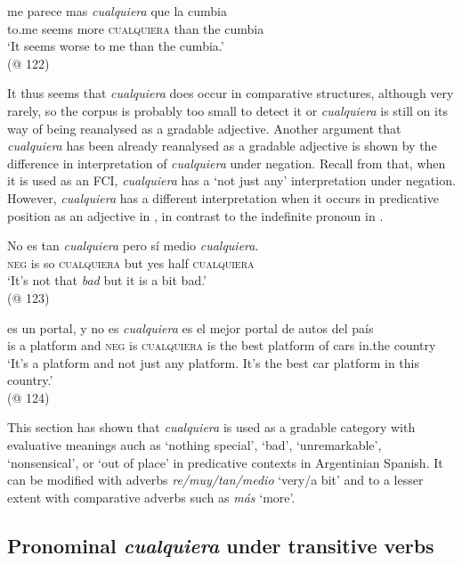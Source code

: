 \ea \label{ex:key:209} %
    \gll me parece mas \textit{cualquiera} que la cumbia\\
    to.me seems more \textsc{cualquiera} than the cumbia\\
    \glt ‘It seems worse to me than the cumbia.’\\
    (@ 122)
\z


It thus seems that \textit{cualquiera} does occur in comparative structures, although very rarely, so the corpus is probably too small to detect it or \textit{cualquiera} is still on its way of being reanalysed as a gradable adjective. Another argument that \textit{cualquiera} has been already reanalysed as a gradable adjective is shown by the difference in interpretation of \textit{cualquiera} under negation. Recall from  that, when it is used as an FCI, \textit{cualquiera} has a ‘not just any’ interpretation under negation. However, \textit{cualquiera} has a different interpretation when it occurs in predicative position as an adjective in , in contrast to the indefinite pronoun in .

\ea \label{bkm:Ref63460902}  %
    \gll No es tan \textit{cualquiera} pero sí medio \textit{cualquiera}.\\
    \textsc{neg} is so \textsc{cualquiera} but yes half  \textsc{cualquiera}\\
    \glt ‘It’s not that \textit{bad} but it is a bit bad.’\\
    (@ 123)
\z

\ea \label{bkm:Ref63460922}  %
\gll es un portal, y no es \textit{cualquiera} es el mejor portal de autos del país\\
    is a platform and \textsc{neg} is \textsc{cualquiera} is the best platform of cars in.the country\\
\glt ‘It’s a platform and not just any platform. It’s the best car platform in this country.’\\
    (@ 124)
\z

This section has shown that \textit{cualquiera} is used as a gradable category with evaluative meanings auch as ‘nothing special’, ‘bad’, ‘unremarkable’, ‘nonsensical’, or ‘out of place’ in predicative contexts in Argentinian Spanish. It can be modified with adverbs \textit{re/muy/tan/medio} ‘very/a bit’ and to a lesser extent with comparative adverbs such as \textit{más} ‘more’.

\subsection{{Pronominal} {\textit{cualquiera}}{ }{under} {transitive} {verbs}} \label{sec:4.3.3}

